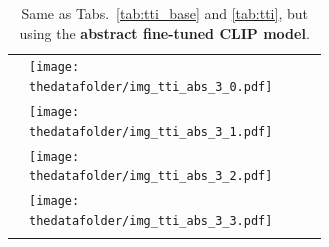 \documentclass[10pt]{article} %
\begin{document}
\begin{table}[h!]
\begin{tabular}{m{2.7cm} p{2.9cm} p{2.9cm} p{2.9cm} p{2.9cm}}
      \midrule
      \texttt{} \vspace{20mm} & \centering \texttt{[image: \\thedatafolder/img\_tti\_abs\_3\_0.pdf]} \\  & \centering \texttt{[image: \\thedatafolder/img\_tti\_abs\_3\_1.pdf]} \\  & \centering \texttt{[image: \\thedatafolder/img\_tti\_abs\_3\_2.pdf]} \\  & \centering \texttt{[image: \\thedatafolder/img\_tti\_abs\_3\_3.pdf]} \\   \tabularnewline
      \bottomrule
  \end{tabular}
  \caption{Same as Tabs.~\ref{tab:tti_base} and \ref{tab:tti}, but using the \textbf{\textcolor{deepblue}{abstract fine-tuned CLIP model}}.}
  \label{tab:tti_abs}
\end{table}
\end{document}
